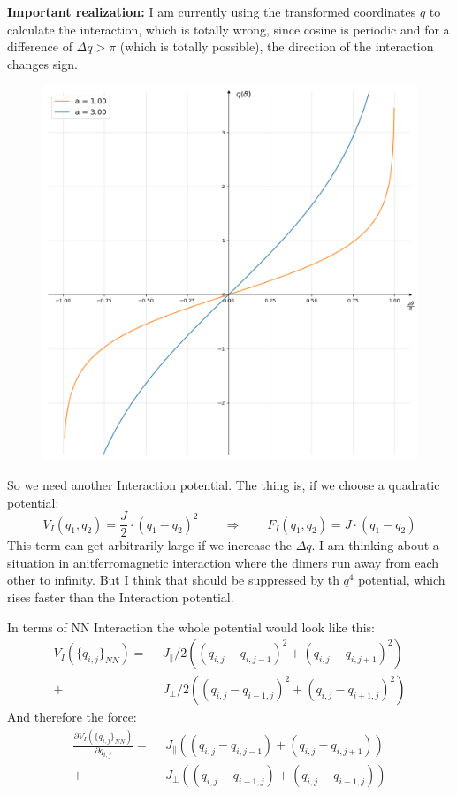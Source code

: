 	\textbf{Important realization:} I am currently using the transformed coordinates $q$ to calculate the interaction, which is totally wrong, since cosine is periodic and for a difference of $\Delta q > \pi$ (which is totally possible), the direction of the interaction changes sign.
	\begin{figure}
		\centering
		\includegraphics[width=12cm]{graphics/coordinate-trafo.png}
	\end{figure}
	So we need another Interaction potential. The thing is, if we choose a quadratic potential:
	\begin{equation}
		V_I (q_1, q_2) = \frac{J}{2} \cdot (q_1 - q_2) ^2 \qquad \Rightarrow \qquad F_I (q_1, q_2) = J \cdot (q_1 - q_2)
	\end{equation}
	This term can get arbitrarily large if we increase the $\Delta q$. I am thinking about a situation in anitferromagnetic interaction where the dimers run away from each other to infinity. But I think that should be suppressed by th $q^4$ potential, which rises faster than the Interaction potential.
	
	In terms of NN	Interaction the whole potential would look like this:
	\begin{align}
		V_I (\lbrace q_{i, j} \rbrace_{NN}) =	~~&J_{\parallel}/2 \left(\left( q_{i, j} - q_{i, j-1}   \right)^2 + \left(    q_{i, j} - q_{i, j+1}\right)^2 \right) \\
		+ &J_{\perp}/2 \left(\left( q_{i, j} - q_{i-1, j}   \right)^2 + \left(    q_{i, j} - q_{i+1, j}\right)^2 \right)
	\end{align}
	And therefore the force:
	\begin{align}
		\frac{\partial V_I(\lbrace q_{i, j} \rbrace_{NN})}{\partial q_{i, j}} =	~~&J_{\parallel} \left(\left( q_{i, j} - q_{i, j-1}   \right) + \left(    q_{i, j} - q_{i, j+1}\right) \right) \\
		+ &J_{\perp} \left(\left( q_{i, j} - q_{i-1, j}   \right) + \left(    q_{i, j} - q_{i+1, j}\right) \right)
	\end{align}
